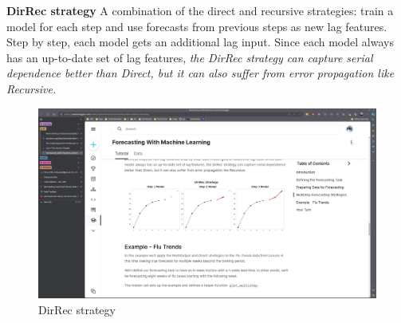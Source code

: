 \documentclass[12pt]{report}
\begin{document}
\textbf{DirRec strategy} A combination of the direct and recursive strategies: train a model for each step and use forecasts from previous steps as new lag features. Step by step, each model gets an additional lag input. Since each model always has an up-to-date set of lag features, \textit{the DirRec strategy can capture serial dependence better than Direct, but it can also suffer from error propagation like Recursive.}

\begin{figure}[htbp]
  \begin{center}
    \includegraphics[trim =24cm 17.0cm 22cm 20cm, clip, scale=0.4]{pics/forecast4.png}
    \caption{DirRec strategy}
    \label{fig:DirRec}
  \end{center}
\end{figure}


%


\end{document}
